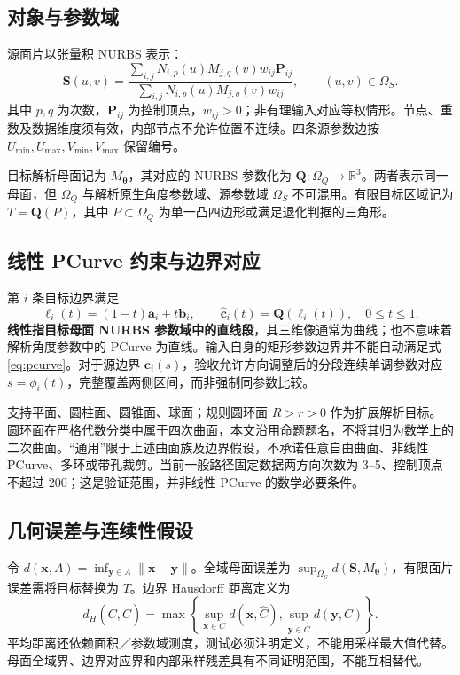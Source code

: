 \documentclass[UTF8,zihao=5,fontset=windows,a4paper]{ctexart}
\newcommand{\R}{\mathbb R}
\begin{document}
\subsection{对象与参数域}
源面片以张量积 NURBS 表示：
\begin{equation}
\mathbf S(u,v)=\frac{\sum_{i,j}N_{i,p}(u)M_{j,q}(v)w_{ij}\mathbf P_{ij}}
 {\sum_{i,j}N_{i,p}(u)M_{j,q}(v)w_{ij}},\qquad (u,v)\in\Omega_S.
\end{equation}
其中 $p,q$ 为次数，$\mathbf P_{ij}$ 为控制顶点，$w_{ij}>0$；非有理输入对应等权情形。节点、重数及数据维度须有效，内部节点不允许位置不连续。四条源参数边按 $U_{\min},U_{\max},V_{\min},V_{\max}$ 保留编号。

目标解析母面记为 $M_{\boldsymbol\theta}$，其对应的 NURBS 参数化为 $\mathbf Q:\Omega_Q\to\R^3$。两者表示同一母面，但 $\Omega_Q$ 与解析原生角度参数域、源参数域 $\Omega_S$ 不可混用。有限目标区域记为 $T=\mathbf Q(P)$，其中 $P\subset\Omega_Q$ 为单一凸四边形或满足退化判据的三角形。

\subsection{线性 PCurve 约束与边界对应}
第 $i$ 条目标边界满足
\begin{equation}\label{eq:pcurve}
\boldsymbol\ell_i(t)=(1-t)\mathbf a_i+t\mathbf b_i,\qquad
\widehat{\mathbf c}_i(t)=\mathbf Q(\boldsymbol\ell_i(t)),\quad 0\le t\le1.
\end{equation}
\textbf{线性指目标母面 NURBS 参数域中的直线段}，其三维像通常为曲线；也不意味着解析角度参数中的 PCurve 为直线。输入自身的矩形参数边界并不能自动满足式\eqref{eq:pcurve}。对于源边界 $\mathbf c_i(s)$，验收允许方向调整后的分段连续单调参数对应 $s=\phi_i(t)$，完整覆盖两侧区间，而非强制同参数比较。

支持平面、圆柱面、圆锥面、球面；规则圆环面 $R>r>0$ 作为扩展解析目标。圆环面在严格代数分类中属于四次曲面，本文沿用命题题名，不将其归为数学上的二次曲面。“通用”限于上述曲面族及边界假设，不承诺任意自由曲面、非线性 PCurve、多环或带孔裁剪。当前一般路径固定数据两方向次数为 3--5、控制顶点不超过 200；这是验证范围，并非线性 PCurve 的数学必要条件。

\subsection{几何误差与连续性假设}
令 $d(\mathbf x,A)=\inf_{\mathbf y\in A}\|\mathbf x-\mathbf y\|$。全域母面误差为 $\sup_{\Omega_S}d(\mathbf S,M_{\boldsymbol\theta})$，有限面片误差需将目标替换为 $T$。边界 Hausdorff 距离定义为
\begin{equation}\label{eq:hausdorff}
d_H(C,\widehat C)=\max\left\{\sup_{\mathbf x\in C}d(\mathbf x,\widehat C),
\sup_{\mathbf y\in\widehat C}d(\mathbf y,C)\right\}.
\end{equation}
平均距离还依赖面积／参数域测度，测试必须注明定义，不能用采样最大值代替。母面全域界、边界对应界和内部采样残差具有不同证明范围，不能互相替代。
\end{document}
